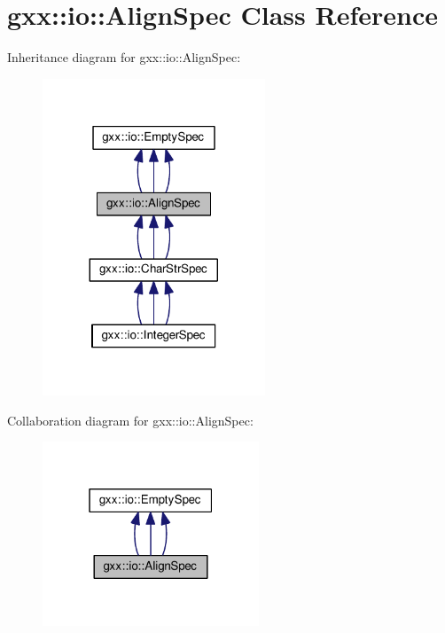 \hypertarget{classgxx_1_1io_1_1AlignSpec}{}\section{gxx\+:\+:io\+:\+:Align\+Spec Class Reference}
\label{classgxx_1_1io_1_1AlignSpec}


Inheritance diagram for gxx\+:\+:io\+:\+:Align\+Spec\+:
\nopagebreak
\begin{figure}[H]
\begin{center}
\leavevmode
\includegraphics[width=188pt]{classgxx_1_1io_1_1AlignSpec__inherit__graph}
\end{center}
\end{figure}


Collaboration diagram for gxx\+:\+:io\+:\+:Align\+Spec\+:
\nopagebreak
\begin{figure}[H]
\begin{center}
\leavevmode
\includegraphics[width=183pt]{classgxx_1_1io_1_1AlignSpec__coll__graph}
\end{center}
\end{figure}
